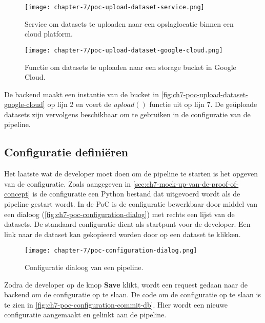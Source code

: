 \begin{figure}[hbt!]
  \centering
  \texttt{[image: chapter-7/poc-upload-dataset-service.png]}
  \caption{Service om datasets te uploaden naar een opslaglocatie binnen een cloud platform.}
  \label{fig:ch7-poc-upload-dataset-service}
\end{figure}

\newpage

\begin{figure}[hbt!]
  \centering
  \texttt{[image: chapter-7/poc-upload-dataset-google-cloud.png]}
  \caption{Functie om datasets te uploaden naar een storage bucket in Google Cloud.}
  \label{fig:ch7-poc-upload-dataset-google-cloud}
\end{figure}

De backend maakt een instantie van de bucket in \autoref{fig:ch7-poc-upload-dataset-google-cloud} op lijn 2 en voert de \(upload()\) functie uit op lijn 7. De geüploade datasets zijn vervolgens beschikbaar om te gebruiken in de configuratie van de pipeline.

\subsection{Configuratie definiëren}\label{subsec:ch7-configuratie-definieren}
Het laatste wat de developer moet doen om de pipeline te starten is het opgeven van de configuratie. Zoals aangegeven in \autoref{sec:ch7-mock-up-van-de-proof-of-concept} is de configuratie een Python bestand dat uitgevoerd wordt als de pipeline gestart wordt. In de PoC is de configuratie bewerkbaar door middel van een dialoog (\autoref{fig:ch7-poc-configuration-dialog}) met rechts een lijst van de datasets. De standaard configuratie dient als startpunt voor de developer. Een link naar de dataset kan gekopieerd worden door op een dataset te klikken.

\begin{figure}[hbt!]
  \centering
  \texttt{[image: chapter-7/poc-configuration-dialog.png]}
  \caption{Configuratie dialoog van een pipeline.}
  \label{fig:ch7-poc-configuration-dialog}
\end{figure}

Zodra de developer op de knop \textbf{Save} klikt, wordt een request gedaan naar de backend om de configuratie op te slaan. De code om de configuratie op te slaan is te zien in \autoref{fig:ch7-poc-configuration-commit-db}. Hier wordt een nieuwe configuratie aangemaakt en gelinkt aan de pipeline.


